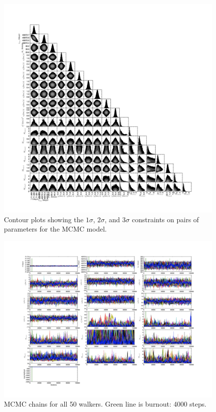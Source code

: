 \documentclass{article}
\begin{document}
\begin{figure}[!htb]
\centering
\includegraphics[width=\textwidth]{corner_100000_FixedEcc.jpg}
\caption{Contour plots showing the $1 \sigma$, $2 \sigma$, and $3 \sigma$ constraints on pairs of parameters for the MCMC model.}
\end{figure}


\begin{figure}[!htb]
\centering
\includegraphics[width=\textwidth]{chainPlot_100000_FixedEcc.jpg}
\caption{MCMC chains for all 50 walkers. Green line is burnout: 4000 steps.}
\end{figure}
\end{document}
